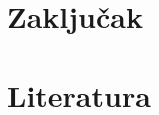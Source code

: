 \documentclass[a4paper, 12pt]{article}
\begin{document}
\begingroup
\justifying
\section{Zaključak}

\vspace{10pt}

%
%
%
%
%
%
%
%
%
\pagebreak
\endgroup

\begingroup
\sloppy

\section{Literatura}

\vspace{10pt}
\end{document}

